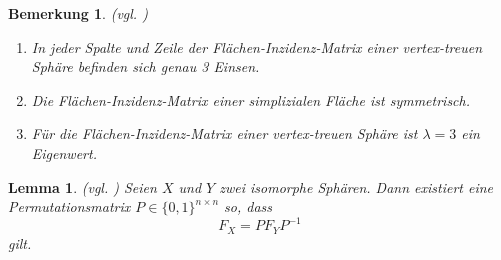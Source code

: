 \documentclass[12pt,titlepage,twoside,cleardoublepage]{article}
\theoremstyle{nummermitklammern}
\newtheorem{lemma}[temp]{Lemma}
\newtheorem{bemerkung}[temp]{Bemerkung}
\newtheorem{lemma}[zahl]{Lemma}
\newtheorem{bemerkung}[zahl]{Bemerkung}
\numberwithin{equation}{section}
\begin{document}
\begin{bemerkung}{\textsc{(}vgl. \textsc{\cite{simp})}}
\begin{enumerate}
\item In jeder Spalte und Zeile der Flächen-Inzidenz-Matrix einer vertex-treuen Sphäre befinden sich genau 3 Einsen. 
\item Die Flächen-Inzidenz-Matrix einer simplizialen Fläche  ist symmetrisch.
\item Für die Flächen-Inzidenz-Matrix einer vertex-treuen Sphäre ist $\lambda =3$ ein Eigenwert.
\end{enumerate}
\end{bemerkung}
\begin{lemma}{\textsc{(}vgl. \textsc{\cite{simp})}}
Seien $X$ und $Y$ zwei isomorphe Sphären. Dann existiert eine Permutationsmatrix $P\in \{0,1\}^{n \times n}$ so, dass 
\[
F_X=PF_YP^{-1}
\] 
gilt.
\end{lemma}
\end{document}
